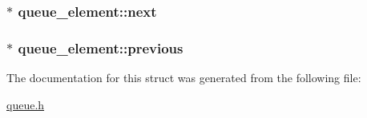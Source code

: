 \subsubsection[{next}]{$\ast$ queue\+\_\+element\+::next}\label{structqueue__element_a2c7d89dd72af6c9b1b17b89997178954}
\hypertarget{structqueue__element_af0eb3333c8ba1fed6e9e15e03d286b93}{}
\subsubsection[{previous}]{$\ast$ queue\+\_\+element\+::previous}\label{structqueue__element_af0eb3333c8ba1fed6e9e15e03d286b93}


The documentation for this struct was generated from the following file\+:\begin{DoxyCompactItemize}
\item 
\hyperlink{queue_8h}{queue.\+h}\end{DoxyCompactItemize}
